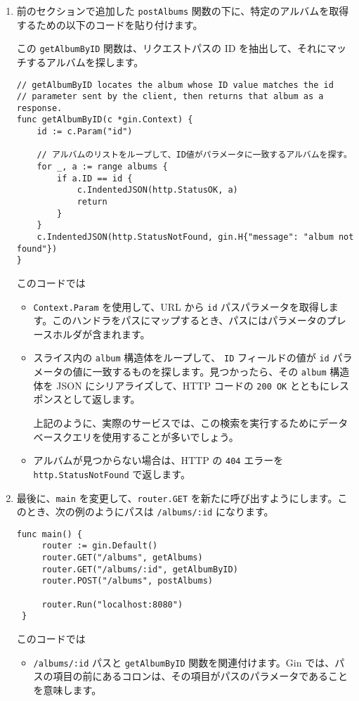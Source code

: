 \begin{enumerate}
\item
  前のセクションで追加した \texttt{postAlbums}
  関数の下に、特定のアルバムを取得するための以下のコードを貼り付けます。

  この \texttt{getAlbumByID} 関数は、リクエストパスの ID
  を抽出して、それにマッチするアルバムを探します。

\begin{lstlisting}[numbers=none]
// getAlbumByID locates the album whose ID value matches the id
// parameter sent by the client, then returns that album as a response.
func getAlbumByID(c *gin.Context) {
    id := c.Param("id")

    // アルバムのリストをループして、ID値がパラメータに一致するアルバムを探す。
    for _, a := range albums {
        if a.ID == id {
            c.IndentedJSON(http.StatusOK, a)
            return
        }
    }
    c.IndentedJSON(http.StatusNotFound, gin.H{"message": "album not found"})
}
\end{lstlisting}

  このコードでは

  \begin{itemize}
  \item
    \texttt{Context.Param} を使用して、URL から \texttt{id}
    パスパラメータを取得します。このハンドラをパスにマップするとき、パスにはパラメータのプレースホルダが含まれます。
  \item
    スライス内の \texttt{album} 構造体をループして、 \texttt{ID}
    フィールドの値が \texttt{id}
    パラメータの値に一致するものを探します。見つかったら、その
    \texttt{album} 構造体を JSON にシリアライズして、HTTP コードの
    \texttt{200\ OK} とともにレスポンスとして返します。

    上記のように、実際のサービスでは、この検索を実行するためにデータベースクエリを使用することが多いでしょう。
  \item
    アルバムが見つからない場合は、HTTP の \texttt{404} エラーを
    \texttt{http.StatusNotFound} で返します。
  \end{itemize}
\item
  最後に、\texttt{main} を変更して、\texttt{router.GET}
  を新たに呼び出すようにします。このとき、次の例のようにパスは
  \texttt{/albums/:id} になります。

\begin{lstlisting}[numbers=none]
 func main() {
     router := gin.Default()
     router.GET("/albums", getAlbums)
     router.GET("/albums/:id", getAlbumByID)
     router.POST("/albums", postAlbums)

     router.Run("localhost:8080")
 }
\end{lstlisting}

  このコードでは

  \begin{itemize}
  
  \item
    \texttt{/albums/:id} パスと \texttt{getAlbumByID}
    関数を関連付けます。Gin
    では、パスの項目の前にあるコロンは、その項目がパスのパラメータであることを意味します。
  \end{itemize}
\end{enumerate}

